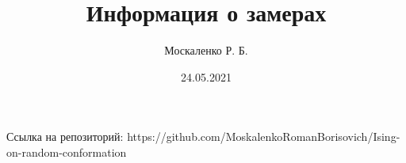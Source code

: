 \documentclass[a4paper,12pt]{article}
\title{Информация о замерах}
\author{Москаленко Р. Б.}
\date{24.05.2021}
\begin{document}
\maketitle

%





%



\begin{thebibliography}{9}
 Ссылка на репозиторий: https://github.com/MoskalenkoRomanBorisovich/Ising-on-random-conformation 
\end{thebibliography}
\end{document}
